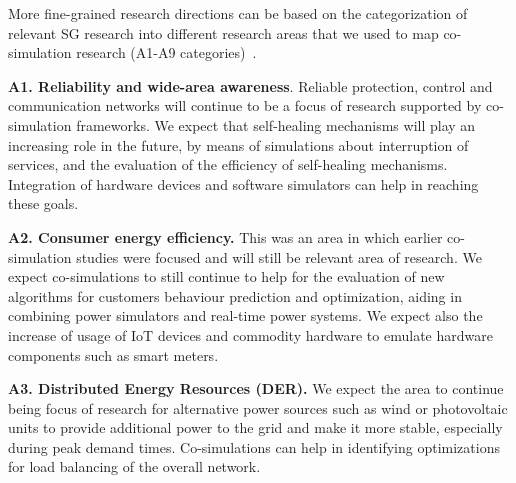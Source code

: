 \documentclass[1p]{elsarticle} %
\begin{document}
More fine-grained research directions can be based on the categorization of relevant SG research into different research areas that we used to map co-simulation research (A1-A9 categories)~\cite{ref:cintuglu2017survey}.

\noindent \textbf{A1. Reliability and wide-area awareness}. Reliable protection, control and communication networks will continue to be a focus of research supported by co-simulation frameworks. We expect that self-healing mechanisms will play an increasing role in the future, by means of simulations about interruption of services, and the evaluation of the efficiency of self-healing mechanisms. Integration of hardware devices and software simulators can help in reaching these goals.



\noindent \textbf{A2. Consumer energy efficiency.} This was an area in which earlier co-simulation studies were focused and will still be relevant area of research. We expect co-simulations to still continue to help for the evaluation of new algorithms for customers behaviour prediction and optimization, aiding in combining power simulators and real-time power systems. We expect also the increase of usage of IoT devices and commodity hardware to emulate hardware components such as smart meters.


\noindent \textbf{A3. Distributed   Energy   Resources   (DER).} We expect the area to continue being focus of research for alternative power sources such as wind or photovoltaic units to provide additional power to the grid and make it more stable, especially during peak demand times. Co-simulations can help in identifying optimizations for load balancing of the overall network.


\end{document}
